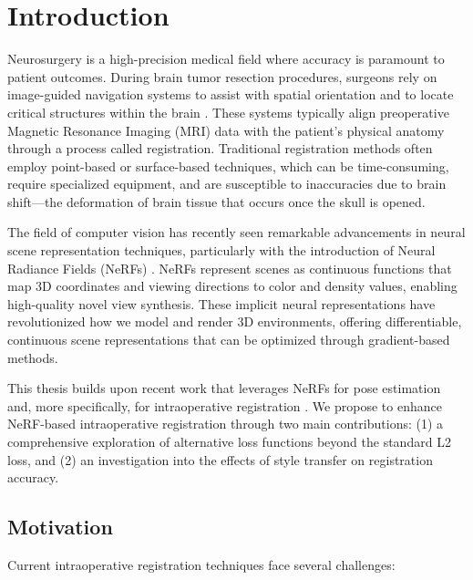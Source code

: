 
\chapter{Introduction}\label{chapter:introduction}

Neurosurgery is a high-precision medical field where accuracy is paramount to patient outcomes. During brain tumor resection procedures, surgeons rely on image-guided navigation systems to assist with spatial orientation and to locate critical structures within the brain \parencite{navab2015surgical}. These systems typically align preoperative Magnetic Resonance Imaging (MRI) data with the patient's physical anatomy through a process called registration. Traditional registration methods often employ point-based or surface-based techniques, which can be time-consuming, require specialized equipment, and are susceptible to inaccuracies due to brain shift—the deformation of brain tissue that occurs once the skull is opened.

The field of computer vision has recently seen remarkable advancements in neural scene representation techniques, particularly with the introduction of Neural Radiance Fields (NeRFs) \parencite{mildenhall2020nerf}. NeRFs represent scenes as continuous functions that map 3D coordinates and viewing directions to color and density values, enabling high-quality novel view synthesis. These implicit neural representations have revolutionized how we model and render 3D environments, offering differentiable, continuous scene representations that can be optimized through gradient-based methods.

This thesis builds upon recent work that leverages NeRFs for pose estimation \parencite{yen2020inerf} and, more specifically, for intraoperative registration \parencite{fehrentz2024intraoperative}. We propose to enhance NeRF-based intraoperative registration through two main contributions: (1) a comprehensive exploration of alternative loss functions beyond the standard L2 loss, and (2) an investigation into the effects of style transfer on registration accuracy.

\section{Motivation}

Current intraoperative registration techniques face several challenges:

